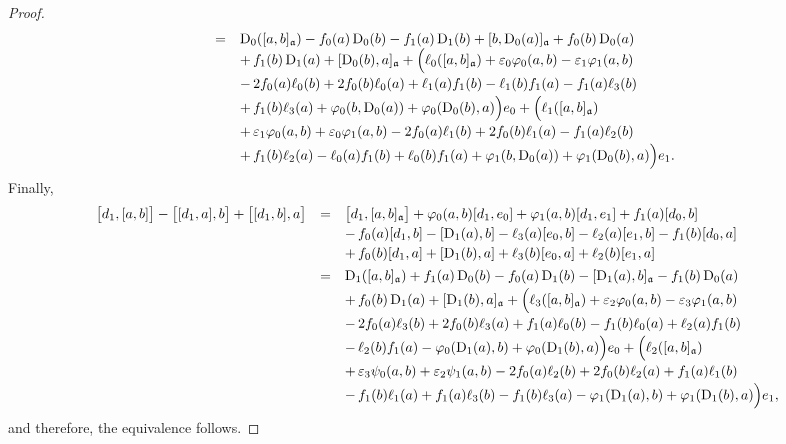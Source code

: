 \documentclass[final,1p,times,nopreprintline]{elsarticle}
\theoremstyle{definition}
\numberwithin{equation}{section}
\newcommand{\ai}{\mathfrak{a}}
\numberwithin{equation}{section}
\newcommand{\D}{\operatorname{D}}
\begin{document}
\begin{proof}
\begin{equation*}
\begin{array}{r c l}
		&=&\D_0([a,b]_\ai)-f_0(a)\D_0(b)-f_1(a)\D_1(b)+[b,\D_0(a)]_\ai+f_0(b)\D_0(a)\\\vspace{0.75mm}
		&&+\,f_1(b)\D_1(a)+[\D_0(b),a]_\ai+\Big(\ell_0([a,b]_\ai)+\varepsilon_0\varphi_0(a,b)-\varepsilon_1\varphi_1(a,b)\\\vspace{0.75mm}
		&&-\,2f_0(a)\ell_0(b)+2f_0(b)\ell_0(a)+\ell_1(a)f_1(b)-\ell_1(b)f_1(a)-f_1(a)\ell_3(b)\\\vspace{0.75mm}
		&&+\,f_1(b)\ell_3(a)+\varphi_0(b,\D_0(a))+\varphi_0(\D_0(b),a)\Big)e_0+\Big(\ell_1([a,b]_\ai)\\\vspace{0.75mm}
		&&+\,\varepsilon_1\varphi_0(a,b)+\varepsilon_0\varphi_1(a,b)-2f_0(a)\ell_1(b)+2f_0(b)\ell_1(a)-f_1(a)\ell_2(b)\\
		&&+\,f_1(b)\ell_2(a)-\ell_0(a)f_1(b)+\ell_0(b)f_1(a)+\varphi_1(b,\D_0(a))+\varphi_1(\D_0(b),a)\Big)e_1.
	\end{array}
	\end{equation*}
	Finally, 
	\begin{equation*}
		\begin{array}{r c l}\vspace{0.75mm}
\big[d_1,[a,b]\big]-\big[[d_1,a],b\big]+\big[[d_1,b],a\big]&=&\big[d_1,[a,b]_\ai\big]+\varphi_0(a,b)[d_1,e_0]+\varphi_1(a,b)[d_1,e_1]+f_1(a)[d_0,b]\\\vspace{0.75mm}
&&-\,f_0(a)[d_1,b]-[\D_1(a),b]-\ell_3(a)[e_0,b]-\ell_2(a)[e_1,b]-f_1(b)[d_0,a]\\\vspace{1.5mm}
		&&+\,f_0(b)[d_1,a]+[\D_1(b),a]+\ell_3(b)[e_0,a]+\ell_2(b)[e_1,a]\\\vspace{0.75mm}
		&=&\D_1([a,b]_\ai)+f_1(a)\D_0(b)-f_0(a)\D_1(b)-[\D_1(a),b]_\ai-f_1(b)\D_0(a)\\\vspace{0.75mm}
		&&+\,f_0(b)\D_1(a)+[\D_1(b),a]_\ai+\Big(\ell_3([a,b]_\ai)+\varepsilon_2\varphi_0(a,b)-\varepsilon_3\varphi_1(a,b)\\\vspace{0.75mm}
		&&-\,2f_0(a)\ell_3(b)+2f_0(b)\ell_3(a)+f_1(a)\ell_0(b)-f_1(b)\ell_0(a)+\ell_2(a)f_1(b)\\\vspace{0.75mm}
		&&-\,\ell_2(b)f_1(a)-\varphi_0(\D_1(a),b)+\varphi_0(\D_1(b),a)\Big)e_0+\Big(\ell_2([a,b]_\ai)\\\vspace{0.75mm}
		&&+\,\varepsilon_3\psi_0(a,b)+\varepsilon_2\psi_1(a,b)-2f_0(a)\ell_2(b)+2f_0(b)\ell_2(a)+f_1(a)\ell_1(b)\\
		&&-\,f_1(b)\ell_1(a)+f_1(a)\ell_3(b)-f_1(b)\ell_3(a)-\varphi_1(\D_1(a),b)+\varphi_1(\D_1(b),a)\Big)e_1,
	\end{array}
\end{equation*}
and therefore, the equivalence follows.
\end{proof}
\end{document}
